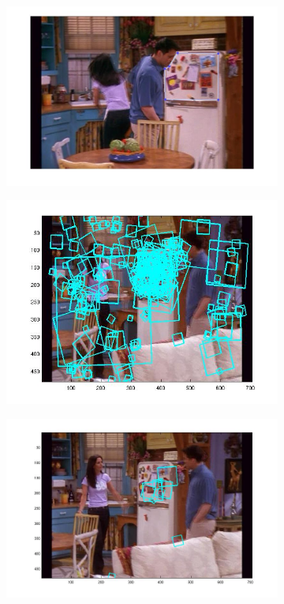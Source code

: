 \documentclass{paper}
\begin{document}
\begin{figure}
  \centering
  \begin{subfigure}[b]{0.7\textwidth}
    \includegraphics[width=\textwidth]{raw_desc_matching_selection}
  \end{subfigure}
  \begin{subfigure}[b]{0.7\textwidth}
    \includegraphics[width=\textwidth]{raw_desc_matching_all}
  \end{subfigure}
    \begin{subfigure}[b]{0.7\textwidth}    
    \includegraphics[width=\textwidth]{raw_desc_matching_topten}

\end{subfigure}
\end{figure}
\end{document}
